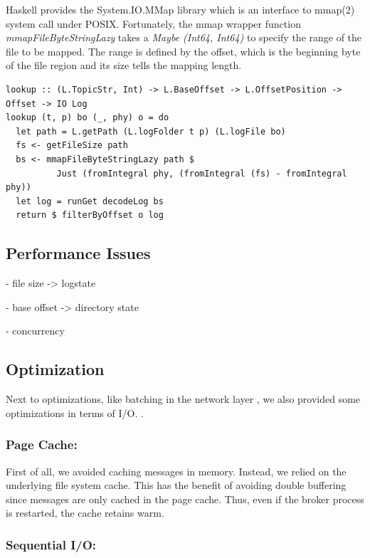 Haskell provides the System.IO.MMap library which is an interface to mmap(2)
system call under POSIX. Fortunately, the mmap wrapper function
\textit{mmapFileByteStringLazy} takes a \textit{Maybe (Int64, Int64)} to specify
the range of the file to be mapped.  The range is defined by the offset, which
is the beginning byte of the file region and its size tells the mapping length.

\begin{lstlisting}
lookup :: (L.TopicStr, Int) -> L.BaseOffset -> L.OffsetPosition -> Offset -> IO Log
lookup (t, p) bo (_, phy) o = do
  let path = L.getPath (L.logFolder t p) (L.logFile bo)
  fs <- getFileSize path
  bs <- mmapFileByteStringLazy path $ 
          Just (fromIntegral phy, (fromIntegral (fs) - fromIntegral phy))
  let log = runGet decodeLog bs
  return $ filterByOffset o log
\end{lstlisting}


\subsection{Performance Issues}
\label{subsec:broker-log-performance-issues}

- file size -> logstate

- base offset -> directory state

- concurrency

\subsection{Optimization}

Next to optimizations, like batching in the network layer ,
we also provided some optimizations in terms of I/O. .

\subsubsection{Page Cache:}

First of all, we avoided caching messages in memory. Instead, we relied on the underlying file system cache. This has the benefit of
avoiding double buffering since messages are only cached in the page cache.
Thus, even if the broker process is restarted, the cache retains warm.


\subsubsection{Sequential I/O: }

